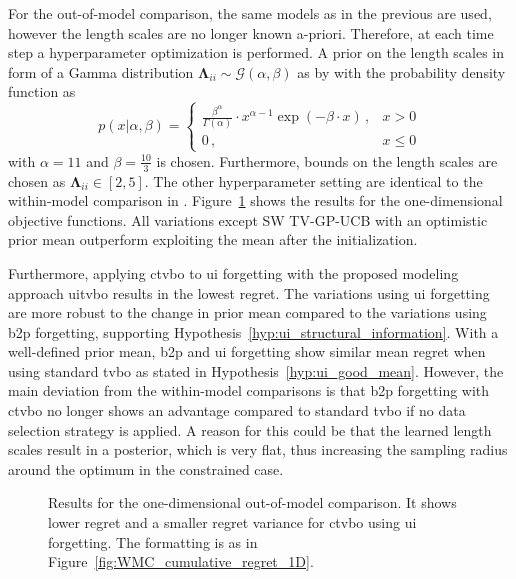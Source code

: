 For the out-of-model comparison, the same models as in the previous  are used, however the length scales are no longer known a-priori. Therefore, at each time step a hyperparameter optimization is performed. A prior on the length scales in form of a Gamma distribution $\boldsymbol\Lambda_{ii} \sim \mathcal{G}(\alpha,\beta)$ as by \textcite{Marco_2016} with the probability density function as
\begin{equation}
    p(x|\alpha,\beta) = \begin{cases}
            \frac{\beta^\alpha}{\Gamma(\alpha)} \cdot x^{\alpha-1} \exp{\left(-\beta \cdot x\right)} \, ,& x > 0\\
            0\, ,&x \leq 0
        \end{cases}
        \label{eq:gamma}
\end{equation}
with $\alpha = 11$ and $\beta = \frac{10}{3}$ is chosen. Furthermore, bounds on the length scales are chosen as $\boldsymbol\Lambda_{ii} \in [2,5]$. The other hyperparameter setting are identical to the within-model comparison in . Figure~\ref{fig:OOMC_cumulative_regret_1D} shows the results for the one-dimensional objective functions. All variations except SW TV-GP-UCB with an optimistic prior mean outperform exploiting the mean after the initialization. 

Furthermore, applying \gls{ctvbo} to \gls{ui} forgetting with the proposed modeling approach \gls{uitvbo} results in the lowest regret. The variations using \gls{ui} forgetting are more robust to the change in prior mean compared to the variations using \gls{b2p} forgetting, supporting Hypothesis~\ref{hyp:ui_structural_information}. With a well-defined prior mean, \gls{b2p} and \gls{ui} forgetting show similar mean regret when using standard \gls{tvbo} as stated in Hypothesis~\ref{hyp:ui_good_mean}. However, the main deviation from the within-model comparisons is that \gls{b2p} forgetting with \gls{ctvbo} no longer shows an advantage compared to standard \gls{tvbo} if no data selection strategy is applied. A reason for this could be that the learned length scales result in a posterior, which is very flat, thus increasing the sampling radius around the optimum in the constrained case.
\begin{figure}[h]
    \centering
    
    \caption[Results of the one-dimensional out-of-model comparison.]{Results for the one-dimensional out-of-model comparison. It shows lower regret and a smaller regret variance for \gls{ctvbo} using \gls{ui} forgetting. The formatting is as in Figure~\ref{fig:WMC_cumulative_regret_1D}.}
    \label{fig:OOMC_cumulative_regret_1D}
\end{figure}

